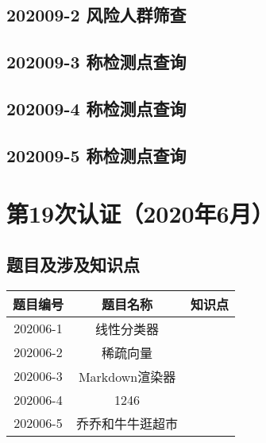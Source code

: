 \documentclass[cn,10pt,math=newtx,citestyle=gb7714-2015,bibstyle=gb7714-2015]{elegantbook}
\newif\ifonlyanalyze %
\begin{document}
\newpage
\section{202009-2 风险人群筛查}
\ifonlyanalyze
\else
    
\fi


\newpage
\section{202009-3 称检测点查询}
\ifonlyanalyze
\else
    
\fi


\newpage
\section{202009-4 称检测点查询}
\ifonlyanalyze
\else
    
\fi


\newpage
\section{202009-5 称检测点查询}
\ifonlyanalyze
\else
    
\fi



\chapter{第19次认证（2020年6月）}

\section{题目及涉及知识点}

\begin{table}[htbp]
    \centering
    \begin{tabular}{ccc}
        \toprule
        题目编号 & 题目名称         & 知识点 \\
        \midrule
        202006-1 & 线性分类器       &        \\
        202006-2 & 稀疏向量         &        \\
        202006-3 & Markdown渲染器   &        \\
        202006-4 & 1246             &        \\
        202006-5 & 乔乔和牛牛逛超市 &        \\
        \bottomrule
    \end{tabular}
\end{table}
\end{document}
